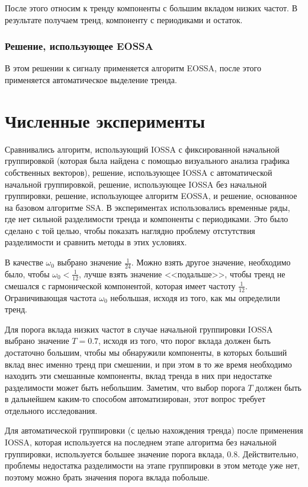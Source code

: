 \documentclass[specialist, substylefile = spbureport.rtx, subf,href,colorlinks=true, 12pt]{disser}
\theoremstyle{definition}
\begin{document}
После этого относим к тренду компоненты с большим вкладом низких
частот. В результате получаем тренд, компоненту с периодиками и остаток.

\subsection{Решение, использующее EOSSA}
В этом решении к сигналу применяется алгоритм EOSSA, после этого применяется автоматическое выделение тренда.

\chapter{Численные эксперименты}
Сравнивались алгоритм, использующий IOSSA с фиксированной начальной группировкой (которая была найдена с помощью визуального анализа графика собственных векторов),
решение, использующее IOSSA с автоматической начальной группировкой, решение, использующее IOSSA без начальной группировки, решение, использующее алгоритм EOSSA, и решение, основанное на базовом алгоритме SSA. В экспериментах использовались временные ряды, где нет сильной разделимости тренда и компоненты с периодиками. Это было сделано с той целью, чтобы показать наглядно проблему отстутствия разделимости и сравнить методы в этих условиях.

В качестве $\omega_0$ выбрано значение $\frac{1}{24}$. Можно взять другое значение, необходимо было, чтобы $\omega_0 < \frac{1}{12}$, лучше взять значение <<подальше>>, чтобы тренд не смешался с гармонической компонентой, которая имеет частоту $\frac{1}{12}$. Ограничивающая частота $\omega_0$ небольшая, исходя из того, как мы определили тренд.

Для порога вклада низких частот в случае начальной группировки IOSSA выбрано значение $T = 0.7$, исходя из того, что порог вклада должен быть достаточно большим, чтобы мы обнаружили компоненты, в которых больший вклад внес именно тренд при смешении, и при этом в то же время необходимо находить эти смешанные компоненты, вклад тренда в них при недостатке разделимости может быть небольшим.
Заметим, что выбор порога $T$ должен быть в дальнейшем каким-то способом автоматизирован, этот вопрос требует отдельного исследования.

Для автоматической группировки (с целью нахождения тренда) после применения IOSSA, которая используется на последнем этапе алгоритма без начальной группировки, используется большее значение порога вклада, $0.8$. Действительно, проблемы недостатка разделимости на этапе группировки в этом методе уже нет, поэтому можно брать значения порога вклада побольше.
\end{document}
